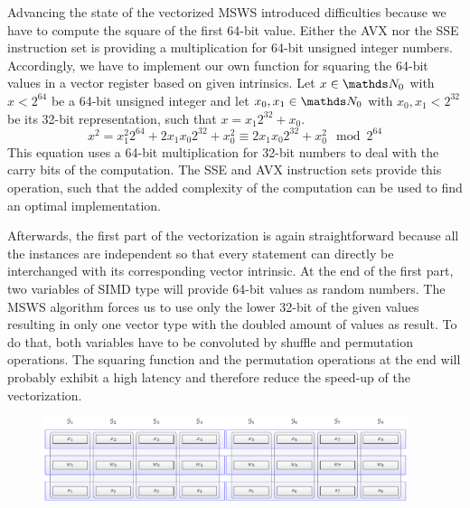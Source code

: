 \documentclass{stdlocal}
\begin{document}
    Advancing the state of the vectorized MSWS introduced difficulties because we have to compute the square of the first 64-bit value.
    Either the AVX nor the SSE instruction set is providing a multiplication for 64-bit unsigned integer numbers.
    Accordingly, we have to implement our own function for squaring the 64-bit values in a vector register based on given intrinsics.
    Let $x\in\setNatural_0$ with $x < 2^{64}$ be a 64-bit unsigned integer and let $x_0,x_1\in\setNatural_0$ with $x_0,x_1 < 2^{32}$ be its 32-bit representation, such that $x = x_1 2^{32} + x_0$.
    \[
      x^2 = x_1^2 2^{64} + 2x_1x_0 2^{32} + x_0^2 \equiv 2x_1x_0 2^{32} + x_0^2 \mod 2^{64}
    \]
    This equation uses a 64-bit multiplication for 32-bit numbers to deal with the carry bits of the computation.
    The SSE and AVX instruction sets provide this operation, such that the added complexity of the computation can be used to find an optimal implementation.

    Afterwards, the first part of the vectorization is again straightforward because all the instances are independent so that every statement can directly be interchanged with its corresponding vector intrinsic.
    At the end of the first part, two variables of SIMD type will provide 64-bit values as random numbers.
    The MSWS algorithm forces us to use only the lower 32-bit of the given values resulting in only one vector type with the doubled amount of values as result.
    To do that, both variables have to be convoluted by shuffle and permutation operations.
    The squaring function and the permutation operations at the end will probably exhibit a high latency and therefore reduce the speed-up of the vectorization.


    \begin{figure}
      \center
      \includegraphics[width=0.95\textwidth]{figures/msws_vector_layout.pdf}
      \caption[MSWS Vector Layout]{}
      \label{fig:msws-vector-layout}
    \end{figure}
\end{document}
